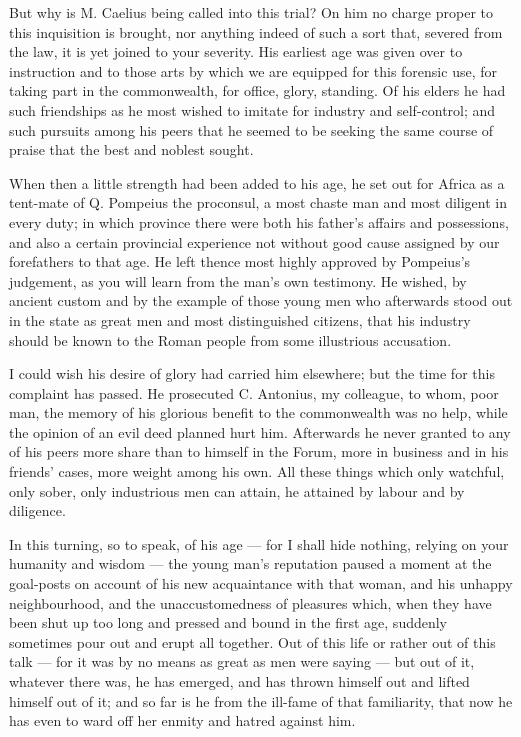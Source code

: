  But why is M. Caelius being called into this trial? On him no charge proper to this inquisition is brought, nor anything indeed of such a sort that, severed from the law, it is yet joined to your severity. His earliest age was given over to instruction and to those arts by which we are equipped for this forensic use, for taking part in the commonwealth, for office, glory, standing. Of his elders he had such friendships as he most wished to imitate for industry and self-control; and such pursuits among his peers that he seemed to be seeking the same course of praise that the best and noblest sought.

 When then a little strength had been added to his age, he set out for Africa as a tent-mate of Q. Pompeius the proconsul, a most chaste man and most diligent in every duty; in which province there were both his father's affairs and possessions, and also a certain provincial experience not without good cause assigned by our forefathers to that age. He left thence most highly approved by Pompeius's judgement, as you will learn from the man's own testimony. He wished, by ancient custom and by the example of those young men who afterwards stood out in the state as great men and most distinguished citizens, that his industry should be known to the Roman people from some illustrious accusation.

 I could wish his desire of glory had carried him elsewhere; but the time for this complaint has passed. He prosecuted C. Antonius, my colleague, to whom, poor man, the memory of his glorious benefit to the commonwealth was no help, while the opinion of an evil deed planned hurt him. Afterwards he never granted to any of his peers more share than to himself in the Forum, more in business and in his friends' cases, more weight among his own. All these things which only watchful, only sober, only industrious men can attain, he attained by labour and by diligence.

 In this turning, so to speak, of his age --- for I shall hide nothing, relying on your humanity and wisdom --- the young man's reputation paused a moment at the goal-posts on account of his new acquaintance with that woman, and his unhappy neighbourhood, and the unaccustomedness of pleasures which, when they have been shut up too long and pressed and bound in the first age, suddenly sometimes pour out and erupt all together. Out of this life or rather out of this talk --- for it was by no means as great as men were saying --- but out of it, whatever there was, he has emerged, and has thrown himself out and lifted himself out of it; and so far is he from the ill-fame of that familiarity, that now he has even to ward off her enmity and hatred against him.

